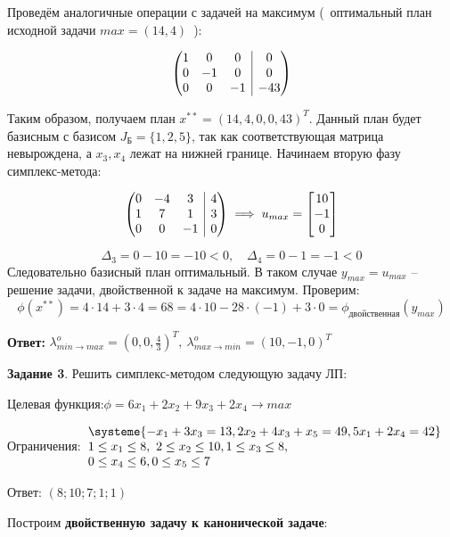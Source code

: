 \documentclass[11pt]{article}
\makeatletter
\newenvironment{amatrix}[1]{%
  \left(\begin{array}{@{}*{#1}{c}|c@{}}
}{%
  \end{array}\right)
}
\makeatother
\begin{document}
Проведём аналогичные операции с задачей на максимум 
(\ оптимальный план исходной задачи $max=(14, 4)$\ ):

$$\begin{amatrix}{3}
	1 &	0 & 0 & 0 \\
	0 & -1 & 0 & 0 \\
	0 & 0 & -1 & -43
\end{amatrix}$$

Таким образом, получаем план $x^{**} = (14, 4, 0, 0, 43)^T$. 
Данный план будет базисным с базисом $J_{\text{Б}}=\{1, 2, 5\}$, 
так 
как соответствующая матрица невырождена, а $x_3, x_4$ лежат
на нижней границе. Начинаем вторую фазу симплекс-метода:

$$\begin{amatrix}{3}
	0 &	-4 & 3 & 4 \\
	1 & 7 & 1 & 3 \\
	0 & 0 & -1 & 0
\end{amatrix} \implies 
u_{max} = \begin{bmatrix}
	10 \\ -1 \\ 0
\end{bmatrix}$$

$$
\Delta_3 =  0 - 10 = -10 < 0, \quad
\Delta_4 =  0 - 1 = -1 < 0
$$
Следовательно базисный план оптимальный. В таком
случае $y_{max} = u_{max}$ -- решение задачи, 
двойственной к задаче на максимум. Проверим:
$$
\phi(x^{**}) = 4\cdot{14} + 3\cdot{4} = 68 =
	4\cdot{10} - 28\cdot{(-1)} + 3\cdot{0} =
	\phi_{двойственная}(y_{max})
$$

\textbf{Ответ: } 
$\lambda^o_{min \rightarrow max} = (0, 0 , \frac43)^T,\  
\lambda^o_{max \rightarrow min} = (10, -1 , 0)^T$

\textbf{Задание 3}. Решить симплекс-методом следующую задачу ЛП:

Целевая функция:\quad   $\phi = 6x_1 + 2x_2 + 9x_3 + 2x_4 \rightarrow{} max$

Ограничения:\quad $
\begin{array}{l}
\systeme{  -x_1 +3x_3 = 13, 2x_2 + 4x_3 + x_5 = 49, 
5x_1 + 2x_4 = 42}\\
1 \leq x_1 \leq 8,\ 2 \leq x_2 \leq 10, 1 \leq x_3 \leq 8,\\
0 \leq x_4 \leq 6, 0 \leq x_5 \leq 7
\end{array}
$

 \hfill

Ответ:  $(8; 10; 7; 1; 1)$

Построим  \textbf{двойственную задачу к канонической задаче}:
\end{document}
